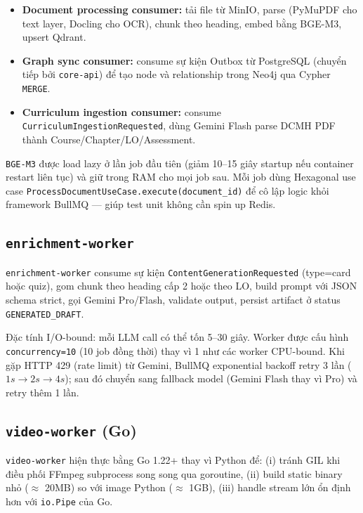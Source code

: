 \begin{itemize}
    \item \textbf{Document processing consumer:} tải file từ MinIO,
          parse (PyMuPDF cho text layer, Docling cho OCR), chunk theo
          heading, embed bằng BGE-M3, upsert Qdrant.
    \item \textbf{Graph sync consumer:} consume sự kiện Outbox từ
          PostgreSQL (chuyển tiếp bởi \texttt{core-api}) để tạo node
          và relationship trong Neo4j qua Cypher \texttt{MERGE}.
    \item \textbf{Curriculum ingestion consumer:} consume
          \texttt{CurriculumIngestionRequested}, dùng Gemini Flash
          parse DCMH PDF thành Course/Chapter/LO/Assessment.
\end{itemize}

\texttt{BGE-M3} được load lazy ở lần job đầu tiên (giảm 10--15 giây
startup nếu container restart liên tục) và giữ trong RAM cho mọi job
sau. Mỗi job dùng Hexagonal use case
\texttt{ProcessDocumentUseCase.execute(document\_id)} để cô lập logic
khỏi framework BullMQ --- giúp test unit không cần spin up Redis.

\subsection{\texttt{enrichment-worker}}

\texttt{enrichment-worker} consume sự kiện
\texttt{ContentGenerationRequested} (type=card hoặc quiz), gom chunk
theo heading cấp 2 hoặc theo LO, build prompt với JSON schema strict,
gọi Gemini Pro/Flash, validate output, persist artifact ở status
\texttt{GENERATED\_DRAFT}.

Đặc tính I/O-bound: mỗi LLM call có thể tốn 5--30 giây. Worker được
cấu hình \texttt{concurrency=10} (10 job đồng thời) thay vì 1 như các
worker CPU-bound. Khi gặp HTTP 429 (rate limit) từ Gemini, BullMQ
exponential backoff retry 3 lần ($1s \to 2s \to 4s$); sau đó chuyển
sang fallback model (Gemini Flash thay vì Pro) và retry thêm 1 lần.

\subsection{\texttt{video-worker} (Go)}

\texttt{video-worker} hiện thực bằng Go 1.22+ thay vì Python để: (i)
tránh GIL khi điều phối FFmpeg subprocess song song qua goroutine,
(ii) build static binary nhỏ ($\approx$ 20MB) so với image Python
($\approx$ 1GB), (iii) handle stream lớn ổn định hơn với
\texttt{io.Pipe} của Go.

